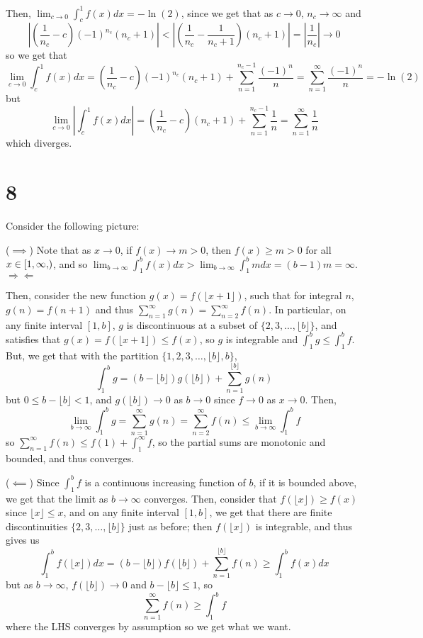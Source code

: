 \documentclass[12pt,letterpaper]{article}
\theoremstyle{definition}
\newcommand{\contra}{\Rightarrow\!\Leftarrow}
\newcommand\halfopen[2]{\ensuremath{[#1,#2)}}
\begin{document}
Then, $\lim_{c \rightarrow 0}\int_{c}^{1}f(x)dx = -\ln(2)$, since we get that as $c \rightarrow 0$, $n_{c} \rightarrow \infty$ and
\[
  \left|\left(\frac{1}{n_{c}} - c\right)(-1)^{n_{c}}(n_{c}+1)\right| < \left|\left(\frac{1}{n_{c}} - \frac{1}{n_{c} + 1}\right)(n_{c}+1)\right| = \left|\frac{1}{n_{c}}\right| \rightarrow 0
\]
so we get that
\[
  \lim_{c \rightarrow 0}\int_{c}^{1}f(x)dx = \left(\frac{1}{n_{c}} - c\right)(-1)^{n_{c}}(n_{c} + 1) + \sum_{n=1}^{n_{c}-1}\frac{(-1)^{n}}{n} = \sum_{n=1}^{\infty}\frac{(-1)^{n}}{n} = -\ln(2)
\]
but
\[
  \lim_{c \rightarrow 0}\left|\int_{c}^{1}f(x)dx\right| = \left(\frac{1}{n_{c}} - c\right)(n_{c} + 1) + \sum_{n=1}^{n_{c}-1}\frac{1}{n} = \sum_{n=1}^{\infty}\frac{1}{n}
\]
which diverges.

\section*{8}

Consider the following picture:

($\implies$) Note that as $x \rightarrow 0$, if $f(x) \rightarrow m > 0$, then $f(x) \geq m > 0$ for all $x \in \halfopen{1, \infty}$, and so $\lim_{b \rightarrow \infty}\int_{1}^{b}f(x)dx > \lim_{b \rightarrow \infty}\int_{1}^{b}mdx = (b-1)m = \infty$. $\contra$

Then, consider the new function $g(x) = f(\lfloor x + 1 \rfloor)$, such that  for integral $n$, $g(n) = f(n + 1)$ and thus $\sum_{n=1}^{\infty}g(n) = \sum_{n=2}^{\infty}f(n)$. In particular, on any finite interval $[1, b]$, $g$ is discontinuous at a subset of $\{2, 3, \dots, \lfloor b \rfloor\}$, and satisfies that $g(x) = f(\lfloor x + 1 \rfloor) \leq f(x)$, so $g$ is integrable and $\int_{1}^{b}g \leq \int_{1}^{b}f$. But, we get that with the partition $\{1,2,3,\dots, \lfloor b \rfloor, b\}$,
\[
  \int_{1}^{b}g = (b - \lfloor b \rfloor)g(\lfloor b \rfloor) + \sum_{n=1}^{\lfloor b \rfloor}g(n)
\]
but $0 \leq b - \lfloor b \rfloor < 1$, and $g(\lfloor b \rfloor) \rightarrow 0$ as $b \rightarrow 0$ since $f \rightarrow 0$ as $x \rightarrow 0$. Then,
\[
  \lim_{b \rightarrow \infty}\int_{1}^{b}g = \sum_{n=1}^{\infty}g(n) = \sum_{n=2}^{\infty}f(n) \leq \lim_{b \rightarrow \infty}\int_{1}^{b}f
\]
so $\sum_{n=1}^{\infty}f(n) \leq f(1) + \int_{1}^{\infty}f$, so the partial sums are monotonic and bounded, and thus converges.

($\impliedby$) Since $\int_{1}^{b}f$ is a continuous increasing function of $b$, if it is bounded above, we get that the limit as $b \rightarrow \infty$ converges. Then, consider that $f(\lfloor x \rfloor) \geq f(x)$ since $\lfloor x \rfloor \leq x$, and on any finite interval $[1,b]$, we get that there are finite discontinuities $\{2,3,\dots, \lfloor b \rfloor\}$ just as before; then $f(\lfloor x \rfloor)$ is integrable, and thus gives us
\[
  \int_{1}^{b}f(\lfloor x \rfloor)dx = (b - \lfloor b \rfloor)f(\lfloor b \rfloor) + \sum_{n=1}^{\lfloor b \rfloor}f(n) \geq \int_{1}^{b}f(x)dx
\]
but as $b \rightarrow \infty$, $f(\lfloor b \rfloor) \rightarrow 0$ and $b - \lfloor b \rfloor \leq 1$, so
\[
  \sum_{n=1}^{\infty}f(n) \geq \int_{1}^{b}f
\]
where the LHS converges by assumption so we get what we want.
\end{document}
